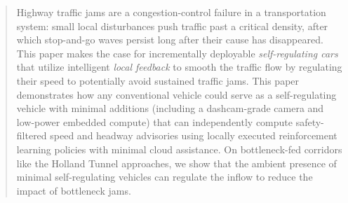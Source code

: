 \begin{abstract}
Highway traffic jams are a congestion-control failure in a transportation system: small local disturbances push traffic past a critical density, after which stop-and-go waves persist long after their cause has disappeared. This paper makes the case for incrementally deployable {\em self-regulating cars} that utilize intelligent {\em local feedback} to smooth the traffic flow by regulating their speed to potentially avoid sustained traffic jams. 
This paper demonstrates how any conventional vehicle could serve as a self-regulating vehicle with minimal additions (including a 
dashcam-grade camera and low-power embedded compute) that can independently compute safety-filtered speed and headway advisories
using locally executed reinforcement learning policies with minimal cloud assistance. On bottleneck-fed corridors like the Holland Tunnel approaches, we show that the ambient presence of minimal self-regulating vehicles can regulate the inflow to reduce the impact of  bottleneck jams. 
\end{abstract}
